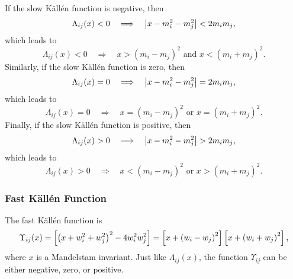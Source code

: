 If the slow K\"{a}ll\'{e}n function is negative, then
\begin{equation}
	\Lambda_{ij}(x) < 0 \quad \Longrightarrow \quad \left\lvert x - m_{i}^{2} - m_{j}^{2} \right\rvert < 2 m_{i} m_{j},
\end{equation}
which leads to
\begin{equation}
	\Lambda_{ij}(x) < 0 \quad \Longrightarrow \quad x > \left(m_{i} - m_{j}\right)^{2} \text{ and } x < \left(m_{i} + m_{j}\right)^{2}.
\end{equation}
Similarly, if the slow K\"{a}ll\'{e}n function is zero, then
\begin{equation}
	\Lambda_{ij}(x) = 0 \quad \Longrightarrow \quad \left\lvert x - m_{i}^{2} - m_{j}^{2} \right\rvert = 2 m_{i} m_{j},
\end{equation}
which leads to
\begin{equation}
	\Lambda_{ij}(x) = 0 \quad \Longrightarrow \quad x = \left(m_{i} - m_{j}\right)^{2} \text{ or } x = \left(m_{i} + m_{j}\right)^{2}.
\end{equation}
Finally, if the slow K\"{a}ll\'{e}n function is positive, then
\begin{equation}
	\Lambda_{ij}(x) > 0 \quad \Longrightarrow \quad \left\lvert x - m_{i}^{2} - m_{j}^{2} \right\rvert > 2 m_{i} m_{j},
\end{equation}
which leads to
\begin{equation}
	\Lambda_{ij}(x) > 0 \quad \Longrightarrow \quad x < \left(m_{i} - m_{j}\right)^{2} \text{ or } x > \left(m_{i} + m_{j}\right)^{2}.
\end{equation}
\subsubsection{Fast K\"{a}ll\'{e}n Function}
The fast K\"{a}ll\'{e}n function is
\begin{equation}
	\Upsilon_{ij}(x) = \left[ \left(x + w_{i}^{2} + w_{j}^{2} \right)^{2} - 4 w_{i}^{2} w_{j}^{2} \right] = \left[ x + \left( w_{i} - w_{j} \right)^{2} \right] \left[ x + \left( w_{i} + w_{j} \right)^{2} \right],
\end{equation}
where $x$ is a Mandelstam invariant. Just like $\Lambda_{ij}(x)$, the function $\Upsilon_{ij}$ can be either negative, zero, or positive.

